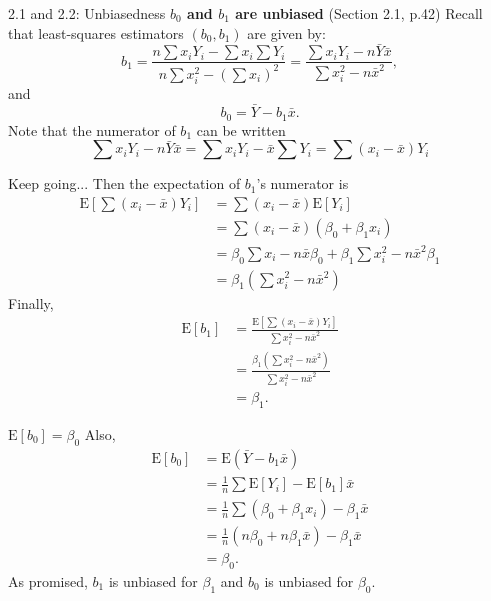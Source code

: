 \documentclass{beamer}
\newcommand{\E}{\mathrm{E}}
\begin{document}
\begin{frame}{2.1 and 2.2: Unbiasedness}
\textbf{$b_0$ and $b_1$ are unbiased} (Section 2.1, p.42) Recall that least-squares estimators $(b_0, b_1)$ are given by:
$$
b_1=\frac{n\sum x_i Y_i-\sum x_i\sum Y_i}{n\sum x_i^2-\left(\sum x_i\right)^2}=\frac{\sum x_i Y_i-n\bar{Y}\bar{x}}{\sum x_i^2-n\bar{x}^2},
$$
and
$$
b_0=\bar{Y}-b_1\bar{x}.
$$
Note that the numerator of $b_1$ can be written
$$
\sum x_i Y_i - n\bar{Y}\bar{x}=\sum x_i Y_i-\bar{x}\sum Y_i = \sum(x_i-\bar{x})Y_i
$$
\end{frame}

\begin{frame}{Keep going...}
Then the expectation of $b_1$'s numerator is
\begin{align*}
\E\left[\sum(x_i-\bar{x})Y_i\right]&=\sum(x_i-\bar{x})\E[Y_i]\\
&=\sum(x_i-\bar{x})(\beta_0+\beta_1 x_i)\\
&=\beta_0\sum x_i-n\bar{x}\beta_0+\beta_1\sum x_i^2-n\bar{x}^2\beta_1\\
&=\beta_1\left(\sum x_i^2-n\bar{x}^2\right)
\end{align*}
Finally,
\begin{align*}
\E[b_1]&=\frac{\E\left[\sum(x_i-\bar{x})Y_i\right]}{\sum x_i^2-n\bar{x}^2}\\
&=\frac{\beta_1\left(\sum x_i^2-n\bar{x}^2\right)}{\sum x_i^2-n\bar{x}^2}\\
&=\beta_1.
\end{align*}
\end{frame}

\begin{frame}{$\E[b_0]=\beta_0$}
Also,
\begin{align*}
\E[b_0]&=\E(\bar{Y}-b_1\bar{x})\\
&=\frac1n\sum\E[Y_i]-\E[b_1]\bar{x}\\
&=\frac1n\sum(\beta_0+\beta_1 x_i)-\beta_1\bar{x}\\
&=\frac1n(n\beta_0+n\beta_1\bar{x})-\beta_1\bar{x}\\
&=\beta_0.
\end{align*}
As promised, $b_1$ is unbiased for $\beta_1$ and $b_0$ is unbiased for $\beta_0$.
\end{frame}
\end{document}
